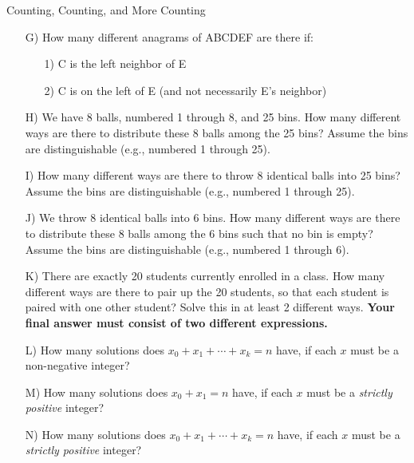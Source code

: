 \begin{homeworkProblem}{Counting, Counting, and More Counting}
\begin{itemize}
\item[G)] How many different anagrams of ABCDEF are there if:
\begin{itemize}
  \item[1)] C is the left neighbor of E
  \item[2)] C is on the left of E (and not necessarily E's neighbor)
\end{itemize}

\item[H)] We have 8 balls, numbered 1 through 8, and 25 bins. How many 
different ways are there to distribute these 8 balls among the 25 bins? 
Assume the bins are distinguishable (e.g., numbered 1 through 25).
  
\item[I)] How many different ways are there to throw 8 identical balls 
into 25 bins? Assume the bins are distinguishable (e.g., numbered 1 
through 25).
 
\item[J)] We throw 8 identical balls into 6 bins. How many different 
ways are there to distribute these 8 balls among the 6 bins such that 
no bin is empty? Assume the bins are distinguishable (e.g., numbered 1 
through 6). 

\item[K)] There are exactly 20 students currently enrolled in a class. 
How many different ways are there to pair up the 20 students, so that 
each student is paired with one other student? Solve this in at least 2 
different ways. \textbf{Your final answer must consist of two different 
expressions. }

\item[L)] How many solutions does $x_0 + x_1 + \cdots + x_k = n$ have, 
if each $x$ must be a non-negative integer?

\item[M)] How many solutions does $x_0 + x_1 = n$ have, if each $x$ must 
be a \emph{strictly positive} integer?

\item[N)] How many solutions does $x_0 + x_1 + \cdots + x_k = n$ have, 
if each $x$ must be a \emph{strictly positive} integer?

\end{itemize}

\end{homeworkProblem}
